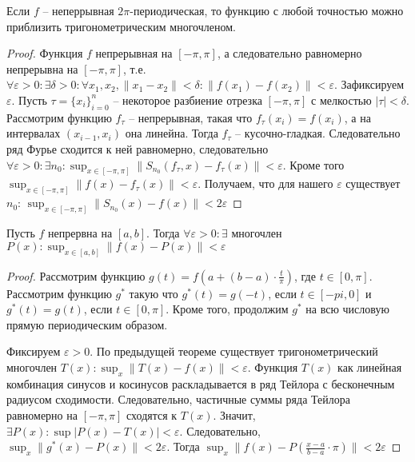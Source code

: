 \documentclass[document.tex]{subfiles}
\begin{document}
\begin{theorem}
    Если $f$ -- неперрывная $2\pi$-периодическая, то функцию с любой точностью можно приблизить тригонометрическим
    многочленом. 
\end{theorem}

\begin{proof}
    Функция $f$ непрерывная на $[-\pi, \pi]$, а следовательно равномерно непрерывна на $[-\pi, \pi]$, т.е. $\forall
    \varepsilon > 0: \exists \delta > 0: \forall x_1, x_2, \|x_1 - x_2\| < \delta: \|f(x_1) - f(x_2)\| < \varepsilon$.
    Зафиксируем $\varepsilon$. Пусть
    $\tau = \{x_i\}_{i = 0}^n$ -- некоторое разбиение отрезка $[-\pi, \pi]$ с мелкостью $|\tau| < \delta$.
    Рассмотрим функцию $f_{\tau}$ -- непрерывная,
    такая что $f_{\tau}(x_i) = f(x_i)$, а на интервалах $(x_{i -1 }, x_i)$ она линейна. Тогда $f_{\tau}$ -- кусочно-гладкая.
    Следовательно ряд Фурье сходится к ней равномерно, следовательно $\forall \varepsilon > 0 : \exists n_0 :
    \sup_{x \in [-\pi, \pi]}\|S_{n_0}(f_{\tau}, x) - f_{\tau}(x)\| < \varepsilon$. Кроме того $\sup_{x \in [-\pi, \pi]}
    \|f(x) - f_{\tau}(x)\| < \varepsilon$. Получаем, что для нашего $\varepsilon$ существует $n_0$: $\sup_{x \in [-\pi,
    \pi]} \|S_{n_0}(x) - f(x)\| < 2\varepsilon$

\end{proof}

\begin{theorem}[Вейрштрасса]
    Пусть $f$ непрервна на $[a, b]$. Тогда $\forall \varepsilon > 0: \exists$ многочлен $P(x): \sup_{x \in [a, b]}
    \|f(x) - P(x)\| < \varepsilon$
\end{theorem}

\begin{proof}
    Рассмотрим функцию $g(t) = f(a + (b - a) \cdot \frac{t}{\pi})$, где $t \in [0, \pi]$. Рассмотрим функцию $g^*$ такую
    что $g^*(t) = g(-t)$, если $t \in [-pi, 0]$ и $g^*(t) = g(t)$, если $t \in [0, \pi]$. Кроме того, продолжим $g^*$ на
    всю числовую прямую периодическим образом.

    Фиксируем $\varepsilon > 0$. По предыдущей теореме существует тригонометрический многочлен $T(x):
    \sup_x \|T(x) - f(x)\| < \varepsilon$. Функция $T(x)$ как линейная комбинация синусов и косинусов раскладывается в
    ряд Тейлора с бесконечным радиусом сходимости. Следовательно, частичные суммы ряда Тейлора равномерно на $[-\pi,
    \pi]$ сходятся к $T(x)$. Значит, $\exists P(x): \sup |P(x) - T(x)| < \varepsilon$.
    Следовательно, $\sup_x \|g^*(x) - P(x)\| < 2 \varepsilon$. Тогда $\sup_x \|f(x) - P(\frac{x - a}{b - a} \cdot
    \pi)\| < 2 \varepsilon$

\end{proof}
\end{document}
